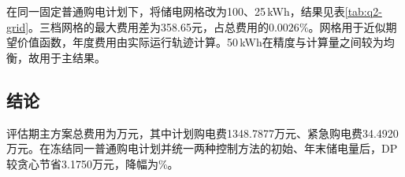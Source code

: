 在同一固定普通购电计划下，将储电网格改为100、25\,kWh，结果见表\ref{tab:q2-grid}。三档网格的最大费用差为358.65元，占总费用的$0.0026\%$。网格用于近似期望价值函数，年度费用由实际运行轨迹计算。50\,kWh在精度与计算量之间较为均衡，故用于主结果。

\begin{table}[H]
    \centering\small
    \caption{固定Ridge与冻结购电计划下的DP网格检验}
    \label{tab:q2-grid}
    \renewcommand{\arraystretch}{1.15}
    
\end{table}

\subsection{结论}

评估期主方案总费用为\QtwoCostWan{}万元，其中计划购电费1348.7877万元、紧急购电费34.4920万元。在冻结同一普通购电计划并统一两种控制方法的初始、年末储电量后，DP较贪心节省3.1750万元，降幅为\QtwoSaveRate\%。

